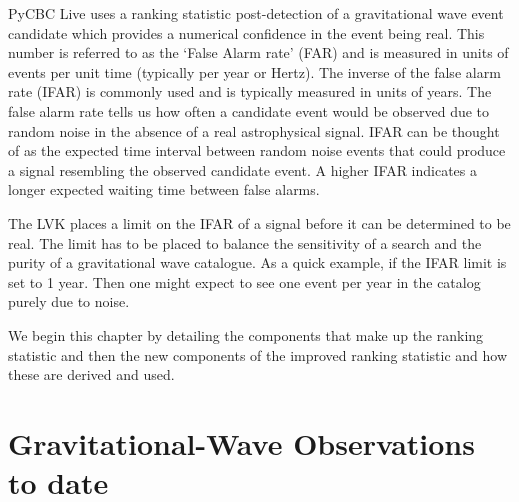 PyCBC Live uses a ranking statistic post-detection of a gravitational wave event candidate which provides a numerical confidence in the event being real. This number is referred to as the `False Alarm rate' (FAR) and is measured in units of events per unit time (typically per year or Hertz). The inverse of the false alarm rate (IFAR) is commonly used and is typically measured in units of years. The false alarm rate tells us how often a candidate event would be observed due to random noise in the absence of a real astrophysical signal. IFAR can be thought of as the expected time interval between random noise events that could produce a signal resembling the observed candidate event. A higher IFAR indicates a longer expected waiting time between false alarms.

The LVK places a limit on the IFAR of a signal before it can be determined to be real. The limit has to be placed to balance the sensitivity of a search and the purity of a gravitational wave catalogue. As a quick example, if the IFAR limit is set to 1 year. Then one might expect to see one event per year in the catalog purely due to noise.

We begin this chapter by detailing the components that make up the ranking statistic and then the new components of the improved ranking statistic and how these are derived and used.

\section{\label{2:sec:current-detections}Gravitational-Wave Observations to date}
